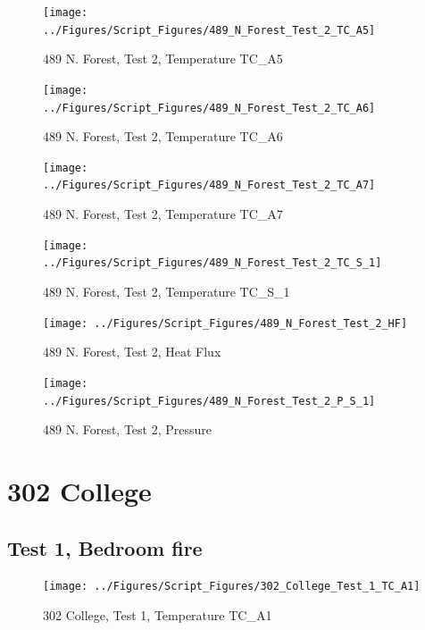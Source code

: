 \documentclass[12pt,oneside]{book}
\begin{document}
\begin{figure}[!ht]
\texttt{[image: ../Figures/Script\_Figures/489\_N\_Forest\_Test\_2\_TC\_A5]}
\caption{489 N. Forest, Test 2, Temperature TC\_A5}
\label{fig:489_N_Forest_Test_2_TC_A5}
\end{figure}

\begin{figure}[!ht]
\texttt{[image: ../Figures/Script\_Figures/489\_N\_Forest\_Test\_2\_TC\_A6]}
\caption{489 N. Forest, Test 2, Temperature TC\_A6}
\label{fig:489_N_Forest_Test_2_TC_A6}
\end{figure}

\begin{figure}[!ht]
\texttt{[image: ../Figures/Script\_Figures/489\_N\_Forest\_Test\_2\_TC\_A7]}
\caption{489 N. Forest, Test 2, Temperature TC\_A7}
\label{fig:489_N_Forest_Test_2_TC_A7}
\end{figure}

\begin{figure}[!ht]
\texttt{[image: ../Figures/Script\_Figures/489\_N\_Forest\_Test\_2\_TC\_S\_1]}
\caption{489 N. Forest, Test 2, Temperature TC\_S\_1}
\label{fig:489_N_Forest_Test_2_TC_S_1}
\end{figure}

\begin{figure}[!ht]
\texttt{[image: ../Figures/Script\_Figures/489\_N\_Forest\_Test\_2\_HF]}
\caption{489 N. Forest, Test 2, Heat Flux}
\label{fig:489_N_Forest_Test_2_HF}
\end{figure}

\begin{figure}[!ht]
\texttt{[image: ../Figures/Script\_Figures/489\_N\_Forest\_Test\_2\_P\_S\_1]}
\caption{489 N. Forest, Test 2, Pressure}
\label{fig:489_N_Forest_Test_2_P_S_1}
\end{figure}


\clearpage


\section{302 College}

\subsection{Test 1, Bedroom fire}

\begin{figure}[!ht]
\texttt{[image: ../Figures/Script\_Figures/302\_College\_Test\_1\_TC\_A1]}
\caption{302 College, Test 1, Temperature TC\_A1}
\label{fig:302_College_Test_1_TC_A1}
\end{figure}
\end{document}
